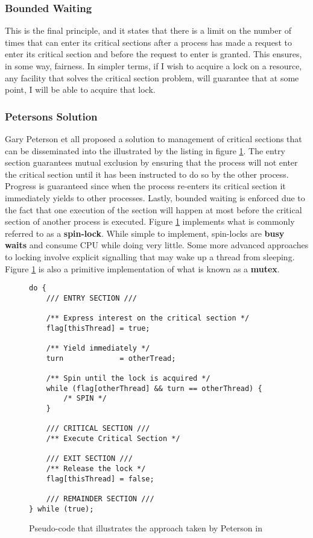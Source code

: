 \documentclass[10pt,a4paper]{article}
\begin{document}
\subsubsection{Bounded Waiting}
This is the final principle, and it states that there is a limit on the number of times that can enter its critical sections after a process has made a request to enter its critical section and before the request to enter is granted. This ensures, in some way, fairness. In simpler terms, if I wish to acquire a lock on a resource, any facility that solves the critical section problem, will guarantee that at some point, I will be able to acquire that lock. 
\subsubsection{Petersons Solution}
Gary Peterson et all \cite{Peterson} proposed a solution to management of critical sections that can be disseminated into the  illustrated by the listing in figure \ref{plisting}. The entry section guarantees mutual exclusion by ensuring that the process will not enter the critical section until it has been instructed to do so by the other process. Progress is guaranteed since when the process re-enters its critical section it immediately yields to other processes. Lastly, bounded waiting is enforced due to the fact that one execution of the section will happen at most before the critical section of another process is executed. Figure \ref{plisting} implements what is commonly referred to as a {\bf spin-lock}. While simple to implement, spin-locks are {\bf busy waits} and consume CPU while doing very little. Some more advanced approaches to locking involve explicit signalling that may wake up a thread from sleeping. Figure \ref{plisting} is also a primitive implementation of what is known as a {\bf mutex}.
\begin{figure}
\caption{Pseudo-code that illustrates the approach taken by Peterson in \cite{Peterson}}
\begin{center}
\begin{lstlisting}
do {
	/// ENTRY SECTION ///

	/** Express interest on the critical section */
	flag[thisThread] = true;
	
	/** Yield immediately */
	turn 			 = otherTread;
	
	/** Spin until the lock is acquired */
	while (flag[otherThread] && turn == otherThread) {
		/* SPIN */
	}
	
	/// CRITICAL SECTION ///
	/** Execute Critical Section */
	
	/// EXIT SECTION ///
	/** Release the lock */
	flag[thisThread] = false;
	
	/// REMAINDER SECTION ///
} while (true);
\end{lstlisting}
\label{plisting}
\end{center}
\end{figure}
\end{document}

